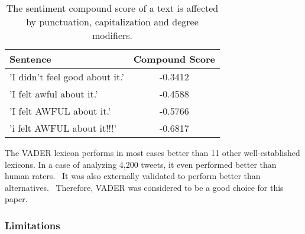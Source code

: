 \begin{table}
    \centering
    \begin{tabular}{lc}
        \hline
        \textbf{Sentence} & \textbf{Compound Score} \\ \hline
        'I didn't feel good about it.' & -0.3412  \\
        'I felt awful about it.' & -0.4588 \\ 
        'I felt AWFUL about it.' & -0.5766 \\ 
        'i felt AWFUL about it!!!' & -0.6817 \\ \hline
    \end{tabular}
    \caption{The sentiment compound score of a text is affected by punctuation, capitalization and degree modifiers.}
    \label{tab:sentiment_analysis_results}
\end{table}


The VADER lexicon performs in most cases better than 11 other well-established lexicons. In a case of analyzing 4,200 tweets, it even performed better than human raters.~\cite{hutto2014vader} It was also externally validated to perform better than alternatives.~\cite{al2020evaluating}\cite{min2020comparative} Therefore, VADER was considered to be a good choice for this paper.



\subsubsection{Limitations}
